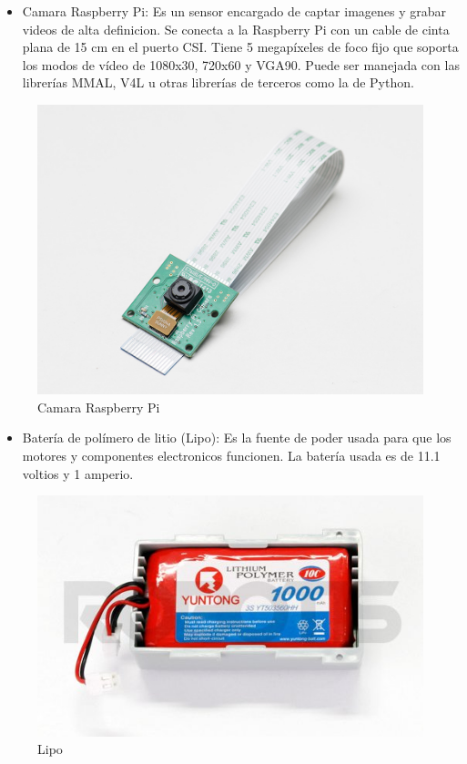 \begin{itemize}
\item Camara Raspberry Pi: Es un sensor encargado de captar imagenes y grabar videos de alta definicion. Se conecta a la Raspberry Pi con un cable de cinta plana de 15 cm en el puerto CSI. Tiene 5 megapíxeles de foco fijo que soporta los modos de vídeo de 1080x30, 720x60 y VGA90. Puede ser manejada con las librerías MMAL, V4L u otras librerías de terceros como la de Python. %

\end{itemize}

\begin{figure}[hbtp]

\centering
\includegraphics[scale=0.7]{imagenes/1367-01.jpg}
\caption{Camara Raspberry Pi}
\end{figure}


\begin{itemize}
\item Batería de polímero de litio (Lipo): Es la fuente de poder usada para que los motores y componentes electronicos funcionen. La batería usada es de 11.1 voltios y 1 amperio. 
\end{itemize}


\begin{figure}[hbtp]

\centering
\includegraphics[scale=0.7]{imagenes/R-LIPOBAT.jpg}
\caption{Lipo}
\end{figure}

